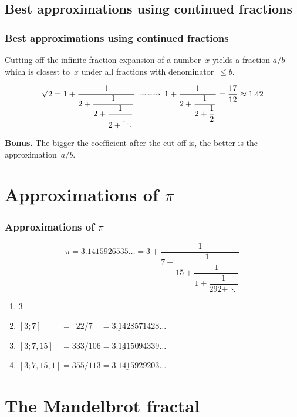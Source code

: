 \documentclass[12pt,compress,english,utf8,t]{beamer}
\makeatletter
\newcommand{\longsquiggly}{\xymatrix{{}\ar@{~>}[r]&{}}}
\newcommand{\icfrac}[4]{#1 + \dfrac{1}{#2 + \dfrac{1}{#3 + \dfrac{1}{#4 + \ddots}}}}
\newcommand{\icfracccc}[5]{#1 + \dfrac{1}{#2 + \dfrac{1}{#3 + \dfrac{1}{#4 + \dfrac{1}{#5 + \ddots}}}}}
\makeatother
\begin{document}
\subsection{Best approximations using continued fractions}

\begin{frame}\frametitle{Best approximations using continued fractions}
  \begin{theorem}
  Cutting off the infinite fraction expansion of a number~$x$
  yields a fraction $a/b$ which is closest to~$x$ under all fractions with
  denominator~$\leq b$.
  \end{theorem}
  \[
    \sqrt{2} = \icfrac{1}{2}{2}{2} \longsquiggly
    1 + \dfrac{1}{2 + \dfrac{1}{2 + \dfrac{1}{2}}} = \frac{17}{12} \approx 1.42
  \]
  \medskip
  \pause

  \textbf{Bonus.} The bigger the coefficient after the cut-off is, the better
  is the approximation~$a/b$.
\end{frame}



\section{\texorpdfstring{Approximations of $\pi$}{Approximations of π}}

\begin{frame}\frametitle{Approximations of $\pi$}
  \[ \pi = 3.1415926535\ldots = \icfracccc{3}{7}{15}{1}{292} \]

  \begin{enumerate}
    \item $3$
    \item $[3;7]\phantom{,15,1} = \phantom{0}22/7\phantom{00} = \underline{3.14}28571428\ldots$
    \item $[3;7,15]\phantom{,1} = 333/106 = \underline{3.1415}094339\ldots$
    \item $[3;7,15,1] = 355/113 = \underline{3.141592}9203\ldots$
  \end{enumerate}
\end{frame}


\section{The Mandelbrot fractal}
\end{document}
